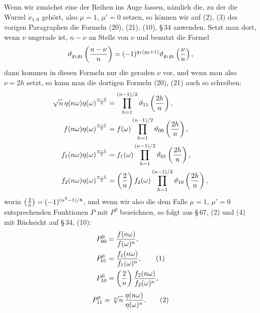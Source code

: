 \documentclass[11pt]{article}
\begin{document}
Wenn wir zunächst eine der Reihen ins Auge fassen, nämlich die, zu der die Wurzel
$x_{1,0}$ gehört, also $\mu=1$, $\mu'=0$ setzen, so können wir auf (2), (3) des vorigen
Paragraphen die Formeln (20), (21), (10), \S\,34 anwenden. Setzt man dort, wenn $\nu$
ungerade ist, $n-\nu$ an Stelle von $\nu$ und benutzt die Formel
\[
 \vartheta_{g_1g_2}\left({n-\nu\over n}\right)
 =(-1)^{g_1(g_2+1)}\vartheta_{g_1g_2}\left({\nu\over n}\right),
\]
dann kommen in diesen Formeln nur die geraden $\nu$ vor, und wenn man also $\nu=2h$
setzt, so kann man die dortigen Formeln (20), (21) auch so schreiben:
\begin{align*}
 \sqrt n\,\eta(n\omega)\eta(\omega)^{\frac{n-3}{2}}
 &=\prod_{h=1}^{(n-1)/2}\vartheta_{11}\left({2h\over n}\right),\\
 f(n\omega)\eta(\omega)^{\frac{n-1}{2}}
 &=f(\omega)\prod_{h=1}^{(n-1)/2}\vartheta_{00}\left({2h\over n}\right),\\
 f_1(n\omega)\eta(\omega)^{\frac{n-1}{2}}
 &=f_1(\omega)\prod_{h=1}^{(n-1)/2}\vartheta_{01}\left({2h\over n}\right),\\
 f_2(n\omega)\eta(\omega)^{\frac{n-1}{2}}
 &=\left({2\over n}\right)f_2(\omega)\prod_{h=1}^{(n-1)/2}\vartheta_{10}\left({2h\over n}\right),
\end{align*}
worin $\left({2\over n}\right)=(-1)^{(n^2-1)/8}$, und wenn wir also die dem Falle
$\mu=1$, $\mu'=0$ entsprechenden Funktionen $P$ mit $P^0$ bezeichnen, so folgt aus
\S\,67, (2) und (4) mit Rücksicht auf \S\,34, (10):
\begin{align}
 P_{00}^0&={f(n\omega)\over f(\omega)^n},\notag\\
 P_{01}^0&={f_1(n\omega)\over f_1(\omega)^n},
\tag{1}\\
 P_{10}^0&=\left({2\over n}\right){f_2(n\omega)\over f_2(\omega)^n},\notag
\end{align}
\begin{equation}
 P_{11}^0=\sqrt[n]{n}\,{\eta(n\omega)\over\eta(\omega)^n}.
\tag{2}
\end{equation}
\end{document}

